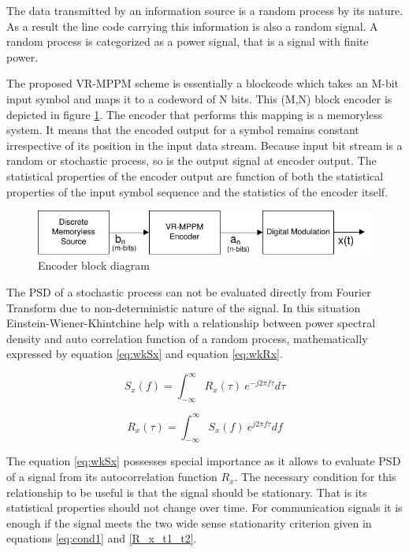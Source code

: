 The data transmitted by an information source is a random process by its nature. As a result the line code carrying this information is also a random signal. A random process is  categorized as a power signal, that is a signal with finite power.

The proposed VR-MPPM scheme is essentially a blockcode which takes an M-bit input symbol and maps it to a codeword of N bits. This (M,N) block encoder is depicted in figure \ref{block_encoder}. The encoder that performs this mapping is a memoryless system. It means that the encoded output for a symbol remains constant irrespective of its position in the input data stream. Because input bit stream is a random or stochastic process, so is the output signal at encoder output. The statistical properties of the encoder output are function of both the statistical properties of the input symbol sequence and the statistics of the encoder itself. 

\begin{figure}
	\includegraphics[width=\textwidth]{./Figures/block_encoder}
	\caption{Encoder block diagram}
	\label{block_encoder}
\end{figure}

The PSD of a stochastic process can not be evaluated directly from Fourier Transform due to non-deterministic nature of the signal. In this situation Einstein-Wiener-Khintchine help with a relationship between power spectral density and auto correlation function of a random process, mathematically expressed by equation \ref{eq:wkSx} and equation \ref{eq:wkRx}.

\begin{equation}
	S_x(f)=\int_{-\infty}^{\infty}R_x(\tau)~e^{-j 2 \pi f \tau} d\tau
	\label{eq:wkSx}
\end{equation}

\begin{equation}
	R_x(\tau)=\int_{-\infty}^{\infty}S_x(f)~e^{j 2 \pi f \tau} df
	\label{eq:wkRx}
\end{equation}

The equation \ref{eq:wkSx} possesses special importance as it allows to evaluate PSD of a signal from its autocorrelation function $R_x$. The necessary condition for this relationship to be useful is that the signal should be stationary. That is its statistical properties should not change over time. For communication signals it is enough if the signal meets the two wide sense stationarity criterion given in equations \ref{eq:cond1} and \ref{R_x_t1_t2}.

